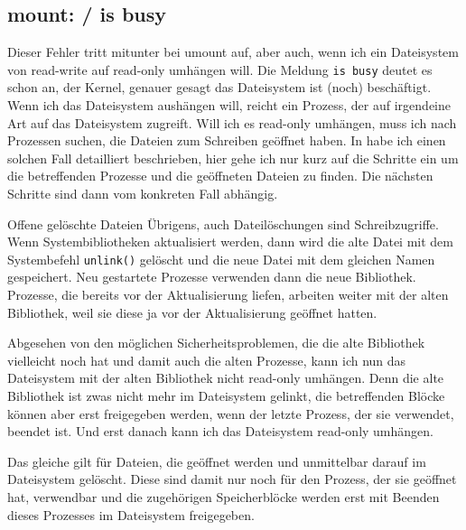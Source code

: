 \subsection{mount: / is busy}
\label{sec:mount-is-busy}
\begin{normaltext}
  Dieser Fehler tritt mitunter bei umount auf, aber auch, wenn ich ein
  Dateisystem von read-write auf read-only umhängen will.
  Die Meldung \verb?is busy? deutet es schon an, der Kernel, genauer gesagt
  das Dateisystem ist (noch) beschäftigt. Wenn ich das Dateisystem aushängen
  will, reicht ein Prozess, der auf irgendeine Art auf das Dateisystem
  zugreift. Will ich es read-only umhängen, muss ich nach Prozessen suchen,
  die Dateien zum Schreiben geöffnet haben. In \cite{weidner12:linuxkopflos}
  habe ich einen solchen Fall detailliert beschrieben, hier gehe ich nur kurz
  auf die Schritte ein um die betreffenden Prozesse und die geöffneten Dateien
  zu finden. Die nächsten Schritte sind dann vom konkreten Fall abhängig.

  \begin{Exkursbox}{Offene gelöschte Dateien}
    Übrigens, auch Dateilöschungen sind Schreibzugriffe. Wenn
    Systembibliotheken aktualisiert werden, dann wird die alte Datei mit dem
    Systembefehl \verb?unlink()? gelöscht und die neue Datei mit dem gleichen
    Namen gespeichert. Neu gestartete Prozesse verwenden dann die neue
    Bibliothek. Prozesse, die bereits vor der Aktualisierung liefen, arbeiten
    weiter mit der alten Bibliothek, weil sie diese ja vor der Aktualisierung
    geöffnet hatten.
    
    Abgesehen von den möglichen Sicherheitsproblemen, die die alte Bibliothek
    vielleicht noch hat und damit auch die alten Prozesse, kann ich nun das
    Dateisystem mit der alten Bibliothek nicht read-only umhängen. Denn die
    alte Bibliothek ist zwas nicht mehr im Dateisystem gelinkt, die
    betreffenden Blöcke können aber erst freigegeben werden, wenn der letzte
    Prozess, der sie verwendet, beendet ist. Und erst danach kann ich das
    Dateisystem read-only umhängen.

    Das gleiche gilt für Dateien, die geöffnet werden und unmittelbar darauf
    im Dateisystem gelöscht. Diese sind damit nur noch für den Prozess, der
    sie geöffnet hat, verwendbar und die zugehörigen Speicherblöcke werden
    erst mit Beenden dieses Prozesses im Dateisystem freigegeben.
  \end{Exkursbox}


\end{normaltext}
